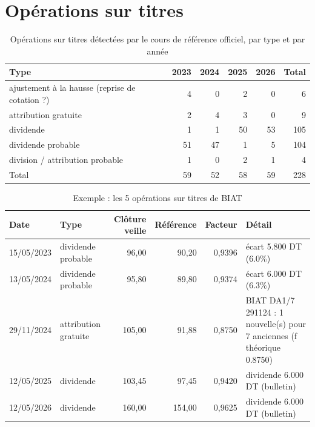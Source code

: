 \documentclass[11pt,a4paper]{article}
\begin{document}
\section{Opérations sur titres}\label{ann:ost}
\begin{table}[H]\centering\small\caption{Opérations sur titres détectées par le cours de référence officiel, par type et par année}\label{tab:annexe-ost}
\begin{tabular}{lrrrrr}\toprule
Type & 2023 & 2024 & 2025 & 2026 & Total \\ \midrule
ajustement à la hausse (reprise de cotation ?) & 4 & 0 & 2 & 0 & 6 \\
attribution gratuite & 2 & 4 & 3 & 0 & 9 \\
dividende & 1 & 1 & 50 & 53 & 105 \\
dividende probable & 51 & 47 & 1 & 5 & 104 \\
division / attribution probable & 1 & 0 & 2 & 1 & 4 \\
\midrule
Total & 59 & 52 & 58 & 59 & 228 \\
\bottomrule\end{tabular}\end{table}
\begin{table}[H]\centering\small\caption{Exemple : les 5 opérations sur titres de BIAT}\label{tab:annexe-biat}
\begin{tabular}{llrrrp{5cm}}\toprule
Date & Type & Clôture veille & Référence & Facteur & Détail \\ \midrule
15/05/2023 & dividende probable & 96{,}00 & 90{,}20 & 0{,}9396 & écart 5.800 DT (6.0\%) \\
13/05/2024 & dividende probable & 95{,}80 & 89{,}80 & 0{,}9374 & écart 6.000 DT (6.3\%) \\
29/11/2024 & attribution gratuite & 105{,}00 & 91{,}88 & 0{,}8750 & BIAT DA1/7 291124 : 1 nouvelle(s) pour 7 anciennes (f théorique 0.8750) \\
12/05/2025 & dividende & 103{,}45 & 97{,}45 & 0{,}9420 & dividende 6.000 DT (bulletin) \\
12/05/2026 & dividende & 160{,}00 & 154{,}00 & 0{,}9625 & dividende 6.000 DT (bulletin) \\
\bottomrule\end{tabular}\end{table}
\end{document}
